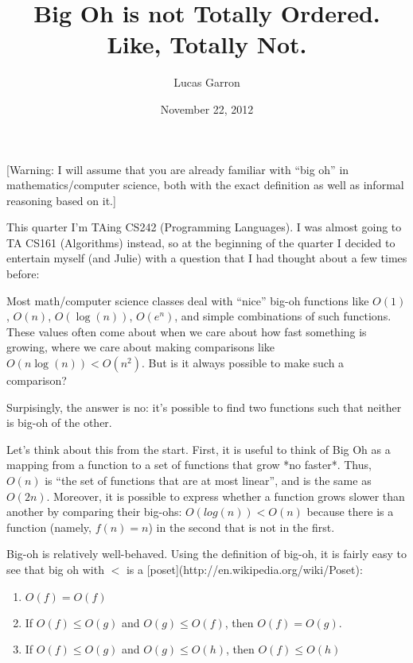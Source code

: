 \documentclass[11pt]{amsart}
\title{Big Oh is not Totally Ordered.\\Like, Totally Not.}
\author{Lucas Garron}
\date{November 22, 2012}                                           %
\begin{document}
\maketitle

[Warning: I will assume that you are already familiar with ``big oh'' in mathematics/computer science, both with the exact definition as well as informal reasoning based on it.]

This quarter I'm TAing CS242 (Programming Languages). I was almost going to TA CS161 (Algorithms) instead, so at the beginning of the quarter I decided to entertain myself (and Julie) with a question that I had thought about a few times before:

Most math/computer science classes deal with ``nice'' big-oh functions like $O(1)$, $O(n)$, $O(\log(n))$, $O(e^n)$, and simple combinations of such functions. These values often come about when we care about how fast something is growing, where we care about making comparisons like $O(n \log(n)) < O(n^2)$. But is it always possible to make such a comparison?

Surpisingly, the answer is no: it's possible to find two functions such that neither is big-oh of the other.

Let's think about this from the start. First, it is useful to think of Big Oh as a mapping from a function to a set of functions that grow *no faster*. Thus, $O(n)$ is ``the set of functions that are at most linear'', and is the same as $O(2n)$. Moreover, it is possible to express whether a function grows slower than another by comparing their big-ohs: $O(log(n)) < O(n)$ because there is a function (namely, $f(n) = n$) in the second that is not in the first.

Big-oh is relatively well-behaved. Using the definition of big-oh, it is fairly easy to see that big oh with $<$ is a [poset](http://en.wikipedia.org/wiki/Poset):

\begin{enumerate}
\item $O(f) = O(f)$
\item If $O(f) \leq O(g)$ and $O(g) \leq O(f)$, then $O(f) = O(g)$.
\item If $O(f) \leq O(g)$ and $O(g) \leq O(h)$, then $O(f) \leq O(h)$
\end{enumerate}
\end{document}
